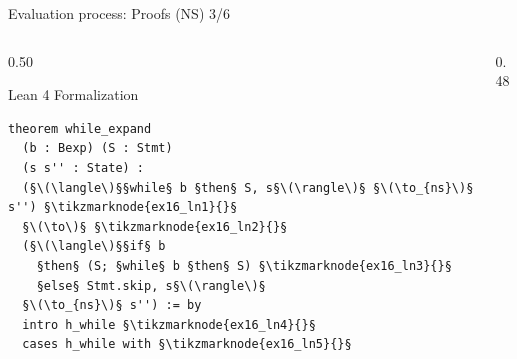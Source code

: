 \documentclass[xcolor={dvipsnames,table}]{beamer}
\begin{document}
\begin{frame}[fragile]{Evaluation process: \alert{Proofs} (NS) 3/6}
    
    \begin{columns}[T]
        
        \begin{column}{0.50\textwidth}
            \begin{block}{Lean 4 Formalization}
                \begin{lstlisting}[style=lean4, basicstyle=\scriptsize\ttfamily]
theorem while_expand
  (b : Bexp) (S : Stmt)
  (s s'' : State) :
  (§\(\langle\)§§while§ b §then§ S, s§\(\rangle\)§ §\(\to_{ns}\)§ s'') §\tikzmarknode{ex16_ln1}{}§
  §\(\to\)§ §\tikzmarknode{ex16_ln2}{}§
  (§\(\langle\)§§if§ b
    §then§ (S; §while§ b §then§ S) §\tikzmarknode{ex16_ln3}{}§
    §else§ Stmt.skip, s§\(\rangle\)§
  §\(\to_{ns}\)§ s'') := by
  intro h_while §\tikzmarknode{ex16_ln4}{}§
  cases h_while with §\tikzmarknode{ex16_ln5}{}§
                \end{lstlisting}
            \end{block}
        \end{column}

        \begin{column}{0.48\textwidth}
        \end{column}
        

\end{columns}
\end{frame}
\end{document}
